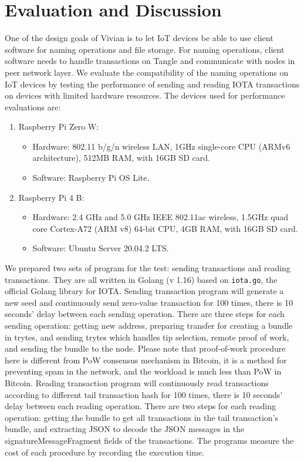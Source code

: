 \section{Evaluation and Discussion}
\label{sec:discussion}

One of the design goals of Vivian is to let IoT devices be able to use client software for naming operations and file storage.
For naming operations, client software needs to handle transactions on Tangle and communicate with nodes in peer network layer.
We evaluate the compatibility of the naming operations on IoT devices by testing the performance of sending and reading IOTA transactions on devices with limited hardware resources.
The devices used for performance evaluations are:

\begin{enumerate}
    \item Raspberry Pi Zero W: 
        \begin{itemize}
            \item Hardware: 802.11 b/g/n wireless LAN, 1GHz single-core CPU (ARMv6 architecture), 512MB RAM, with 16GB SD card.
            \item Software: Raspberry Pi OS Lite.
        \end{itemize}
    \item Raspberry Pi 4 B: 
    \begin{itemize}
        \item Hardware: 2.4 GHz and 5.0 GHz IEEE 802.11ac wireless,  1.5GHz quad core Cortex-A72 (ARM v8) 64-bit CPU, 4GB RAM, with 16GB SD card.
        \item Software: Ubuntu Server 20.04.2 LTS.
    \end{itemize}
\end{enumerate}

We prepared two sets of program for the test: sending transactions and reading transactions. They are all written in Golang (v 1.16) based on \texttt{iota.go}, the official Golang library for IOTA.
Sending transaction program will generate a new seed and continuously send zero-value transaction for 100 times, there is 10 seconds' delay between each sending operation.
There are three steps for each sending operation: getting new address, preparing transfer for creating a bundle in trytes, and sending trytes which handles tip selection, remote proof of work, and sending the bundle to the node.
Please note that proof-of-work procedure here is different from PoW consensus mechanism in Bitcoin, it is a method for preventing spam in the network, and the workload is much less than PoW in Bitcoin.
Reading transaction program will continuously read transactions according to different tail transaction hash for 100  times, there is 10 seconds' delay between each reading operation.
There are two steps for each reading operation: getting the bundle to get all transactions in the tail transaction's bundle, and extracting JSON to decode the JSON messages in the signatureMessageFragment fields of the transactions.
The programs measure the cost of each procedure by recording the execution time.

